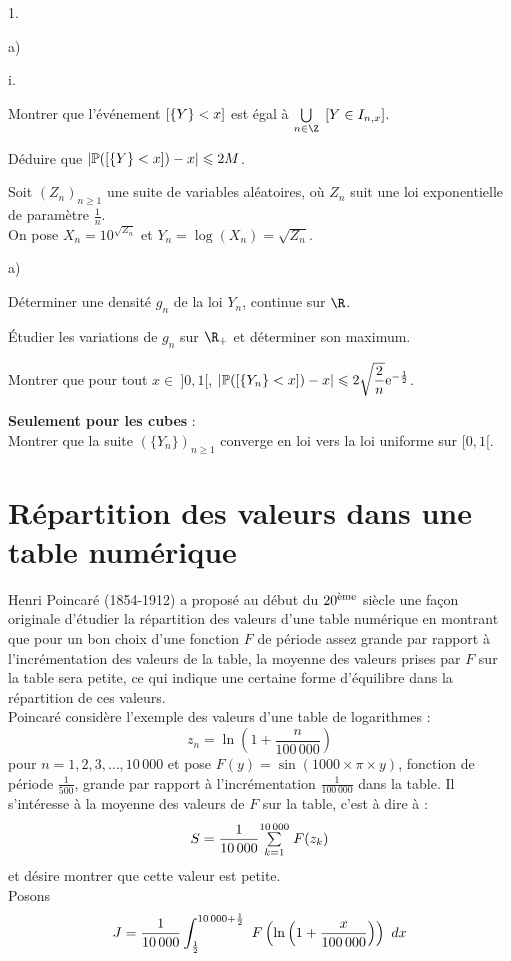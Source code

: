 \documentclass[11pt]{article}%
\begin{document}
\begin{noliste}{1.}
\begin{noliste}{a)}
\begin{nonoliste}{i.}
\item Montrer que l'événement 
$\Ev{\{Y\}<x}$ est égal à $\dcup{n\in\Z}{}\Ev{Y\in I_{n,x}}$.

\item Déduire que  $\vert \Prob(\Ev{\{Y\}<x})-x \vert \leq 2M$.
\end{nonoliste}
\end{noliste}

\item
Soit $(Z_n)_{n \geq 1}$ une suite de variables aléatoires, où 
$Z_n$ suit une loi exponentielle de paramètre $\frac{1}{n}$.\\ 
On pose $X_n=10^{\sqrt{Z_n}}$ et $Y_n=\log (X_n)=\sqrt{Z_n}$. 
 \begin{noliste}{a)}
\item Déterminer une densité $g_n$ de la loi $Y_n$, continue sur 
$\R$. 
\item \'Etudier les variations de $g_n$ sur $\R_+$ et déterminer son 
maximum.
\item Montrer que pour tout $x\in \ ]0,1[$, 
$\vert \Prob(\Ev{\{Y_n\}<x})-x \vert \leq 2\sqrt{\dfrac{2}{n}} 
\ee^{-\frac{1}{2}}$. 
\item {\bf Seulement pour les cubes} : \\
Montrer que la suite $(\{ 
Y_n\})_{n\geq 1}$ converge en loi vers la loi uniforme sur $[0,1[$.
\end{noliste}
\end{noliste}


\section{Répartition des valeurs dans une table numérique}

\noindent
Henri Poincaré (1854-1912) a proposé au début du $\eme{20}$ siècle 
une façon originale d'étudier la répartition des valeurs d'une 
table numérique en montrant que pour un bon choix d'une fonction $F$ 
de période assez grande par rapport à l'incrémentation des 
valeurs de la table, la moyenne des valeurs prises par $F$ sur la table 
sera petite, ce qui indique une certaine forme d'équilibre dans la 
répartition de ces valeurs.\\
Poincaré considère l'exemple des valeurs d'une table de logarithmes :
\[
z_n=\ln\left( 1+\frac n{100 \, 000}\right)
\]
pour $n=1,2,3,\ldots , 10 \, 000$ et pose $F(y)=\sin (1000 
\times \pi \times y)$, fonction de période $\frac{1}{500}$, grande par 
rapport à l'incrémentation $\frac{1}{100 \, 000}$ dans la table. Il 
s'intéresse à la moyenne des valeurs de $F$ sur la table, c'est à dire 
à :
\[
S=\dfrac{1}{10 \, 000}\Sum{k=1}{10 \, 000}F(z_k)
\]
et désire montrer que cette valeur est petite.\\
Posons 
\[
J=\dfrac{1}{10 \, 000}\dint{\frac{1}{2}}{10 \, 000+\frac{1}{2}} 
F\left(\ln \left(1+\frac x{100 \, 000} \right)\right) \dx
\]
\end{document}
